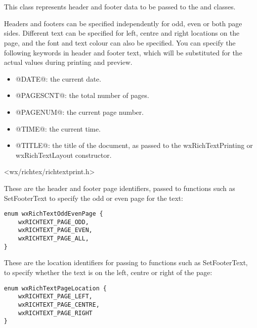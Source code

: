 \section{}\label{wxrichtextheaderfooterdata}


This class represents header and footer data to be passed to the  and
 classes.

Headers and footers can be specified independently for odd, even or both page sides. Different text can be specified
for left, centre and right locations on the page, and the font and text colour can also
be specified. You can specify the following keywords in header and footer text, which will
be substituted for the actual values during printing and preview.

\begin{itemize}\itemsep=0pt
\item @DATE@: the current date.
\item @PAGESCNT@: the total number of pages.
\item @PAGENUM@: the current page number.
\item @TIME@: the current time.
\item @TITLE@: the title of the document, as passed to the wxRichTextPrinting or wxRichTextLayout constructor.
\end{itemize}
 



<wx/richtex/richtextprint.h>


These are the header and footer page identifiers, passed to functions such as SetFooterText to specify
the odd or even page for the text:

\begin{verbatim}
enum wxRichTextOddEvenPage {
    wxRICHTEXT_PAGE_ODD,
    wxRICHTEXT_PAGE_EVEN,
    wxRICHTEXT_PAGE_ALL,
}
\end{verbatim}

These are the location identifiers for passing to functions such as SetFooterText, to specify
whether the text is on the left, centre or right of the page:

\begin{verbatim}
enum wxRichTextPageLocation {
    wxRICHTEXT_PAGE_LEFT,
    wxRICHTEXT_PAGE_CENTRE,
    wxRICHTEXT_PAGE_RIGHT
}
\end{verbatim}

